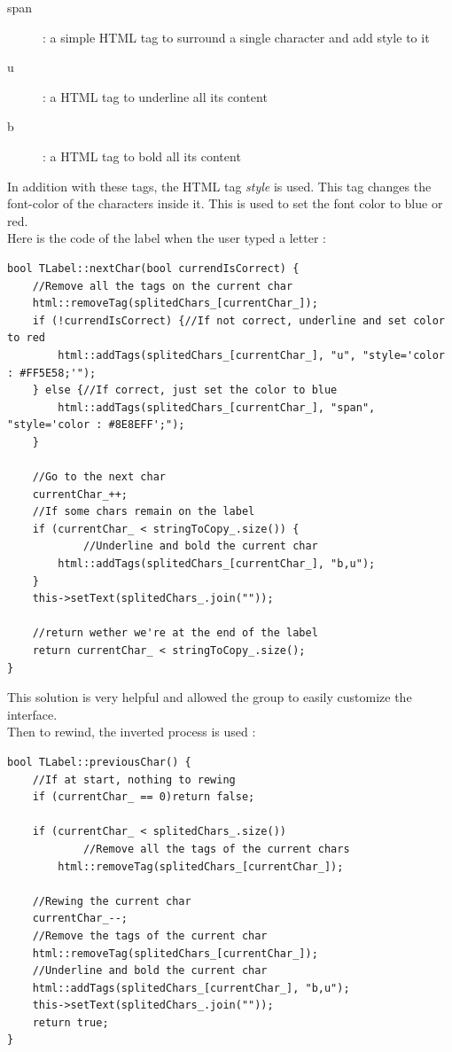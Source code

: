 \begin{description}
	\item[span] : a simple HTML tag to surround a single character and add style to it
	\item[u] : a HTML tag to underline all its content
	\item[b] : a HTML tag to bold all its content
\end{description}

In addition with these tags, the HTML tag \textit{style} is used. This tag changes the font-color of the characters inside it. This is used to set the font color to blue or red.\\
Here is the code of the label when the user typed a letter :
\begin{lstlisting}
bool TLabel::nextChar(bool currendIsCorrect) {
	//Remove all the tags on the current char
    html::removeTag(splitedChars_[currentChar_]);
    if (!currendIsCorrect) {//If not correct, underline and set color to red
        html::addTags(splitedChars_[currentChar_], "u", "style='color : #FF5E58;'");
    } else {//If correct, just set the color to blue
        html::addTags(splitedChars_[currentChar_], "span", "style='color : #8E8EFF';");
    }

	//Go to the next char
    currentChar_++;
    //If some chars remain on the label
    if (currentChar_ < stringToCopy_.size()) {
    		//Underline and bold the current char
        html::addTags(splitedChars_[currentChar_], "b,u");
    }
    this->setText(splitedChars_.join(""));

	//return wether we're at the end of the label
    return currentChar_ < stringToCopy_.size();
}
\end{lstlisting}
This solution is very helpful and allowed the group to easily customize the interface.\\
Then to rewind, the inverted process is used :
\begin{lstlisting}
bool TLabel::previousChar() {
	//If at start, nothing to rewing
    if (currentChar_ == 0)return false;

    if (currentChar_ < splitedChars_.size())
    		//Remove all the tags of the current chars
        html::removeTag(splitedChars_[currentChar_]);

	//Rewing the current char
    currentChar_--;
    //Remove the tags of the current char
    html::removeTag(splitedChars_[currentChar_]);
    //Underline and bold the current char
    html::addTags(splitedChars_[currentChar_], "b,u");
    this->setText(splitedChars_.join(""));
    return true;
}

\end{lstlisting}
